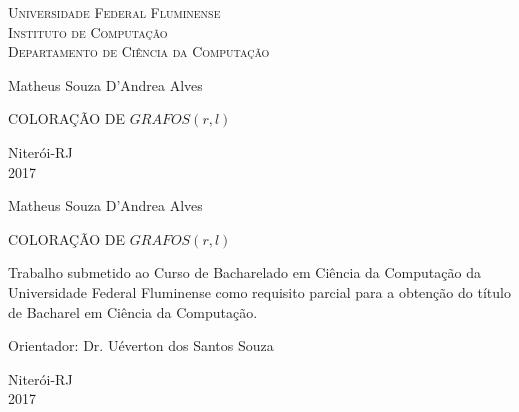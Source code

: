 \documentclass[a4paper,oneside,12pt]{book}
\begin{document}

\begin{titlepage}
  \begin{center}
    \Large{\textsc{Universidade Federal Fluminense} \\
           \textsc{Instituto de Computação} \\
           \textsc{Departamento de Ciência da Computação}
          }
    \par\vspace{3.0cm}
    \LARGE{Matheus Souza D'Andrea Alves}
     \par\vspace{3.0cm}
    \bigskip
    \LARGE{COLORAÇÃO DE $GRAFOS(r,l)$}
    \par\vfill
    \Large{Niterói-RJ\\2017}
  \end{center}
\end{titlepage}




\setcounter{page}{2}




\begin{center}
Matheus Souza D'Andrea Alves


\vfill

COLORAÇÃO DE $GRAFOS(r,l)$

\vspace{3.0cm}

\begin{flushright}
\begin{minipage}{0.50\textwidth}

Trabalho submetido ao Curso de \linebreak Bacharelado em Ciência da
Computação
da Universidade Federal Fluminense como
requisito parcial para a obtenção do título de Bacharel em Ciência da
Computação.

\end{minipage}
\end{flushright}

\vspace{3.0cm}

\begin{flushleft}
Orientador: Dr. Uéverton dos Santos Souza 
\end{flushleft}

\vfill

Niterói-RJ\\2017

\end{center}
\end{document}
